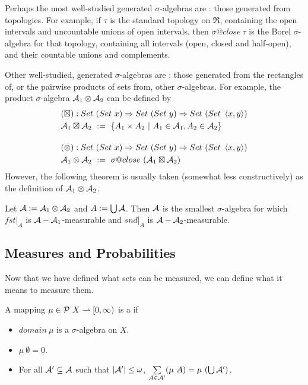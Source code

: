 \documentclass[preprint]{sigplanconf}
\newcommand{\restrict}[1]{\lvert_{#1}}
\newcommand{\pto}{\rightharpoonup}
\begin{document}
Perhaps the most well-studied generated $\sigma$-algebras are : those generated from topologies.
For example, if $\tau$ is the standard topology on $\Re$, containing the open intervals and uncountable unions of open intervals, then $\sigma@close~\tau$ is the Borel $\sigma$-algebra for that topology, containing all intervals (open, closed and half-open), and their countable unions and complements.

Other well-studied, generated $\sigma$-algebras are : those generated from the rectangles of, or the pairwise products of sets from, other $\sigma$-algebras.
For example, the product $\sigma$-algebra $\mathcal{A}_1 \otimes \mathcal{A}_2$ can be defined by
\begin{align}
	&\begin{aligned}
		&(\boxtimes) : Set~(Set~x) \tto Set~(Set~y) \tto Set~(Set~\pair{x,y}) \\
		&\A_1 \boxtimes \A_2 \ := \ \setb{A_1 \times A_2}{A_1 \in \A_1, A_2 \in \A_2} \\
	\end{aligned} \\
\nonumber \\[-6pt]
	&\begin{aligned}
		&(\otimes) : Set~(Set~x) \tto Set~(Set~y) \tto Set~(Set~\pair{x,y}) \\
		&\A_1 \otimes \A_2 \ := \ \sigma@close~(\A_1 \boxtimes \A_2) \\
	\end{aligned}
\end{align}
However, the following theorem is usually taken (somewhat less constructively) as the definition of $\mathcal{A}_1 \otimes \mathcal{A}_2$.
\begin{lemma}
Let $\mathcal{A} := \mathcal{A}_1 \otimes \mathcal{A}_2$ and $A := \textstyle\bigcup\mathcal{A}$.
Then $\mathcal{A}$ is the smallest $\sigma$-algebra for which $fst\restrict{A}$ is $\mathcal{A}-\mathcal{A}_1$-measurable and $snd\restrict{A}$ is $\mathcal{A}-\mathcal{A}_2$-measurable.
\end{lemma}

\subsection{Measures and Probabilities}

Now that we have defined what sets can be measured, we can define what it means to measure them.

\begin{definition}[Measure]
A mapping $\mu \in \powerset~X \pto [0,\infty)$ is a  if
\begin{itemize}
	\item $domain~\mu$ is a $\sigma$-algebra on $X$.
	\item $\mu~\emptyset = 0$.
	\item For all $\mathcal{A}' \subseteq \mathcal{A}$ such that $|\mathcal{A}'| \leq \omega$, $\sum\limits_{A \in \mathcal{A}'} (\mu~A) = \mu~(\textstyle\bigcup \mathcal{A}')$.
\end{itemize}
\end{definition}
\end{document}
